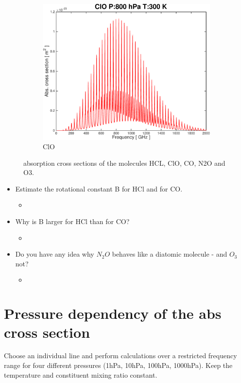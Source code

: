 \documentclass[paper=a4, fontsize=11pt]{scrartcl} %
\begin{document}
\begin{figure}[t!]
    \begin{subfigure}[b]{0.45\textwidth}
        \includegraphics[width=\textwidth]{plots/plot_xsec_ClO_800hPa_300K.pdf}
        \caption{ClO}
    \end{subfigure}

    \caption{absorption cross sections of the molecules HCL, ClO, CO, N2O and O3.}
    \label{fig:abs_molucules}
\end{figure}

\begin{itemize}
    \item Estimate the rotational constant B for HCl and for CO.
    \begin{itemize}
        \item
    \end{itemize}
    \item Why is B larger for HCl than for CO?
    \begin{itemize}
        \item
    \end{itemize}
    \item Do you have any idea why $N_{2}O$ behaves like a diatomic molecule - and $O_{3}$ not?
    \begin{itemize}
        \item
    \end{itemize}
\end{itemize}

\section{Pressure dependency of the abs cross section}
Choose an individual line and perform calculations over a restricted frequency
range for four different pressures (1hPa, 10hPa, 100hPa, 1000hPa). Keep the
temperature and constituent mixing ratio constant.
\end{document}
